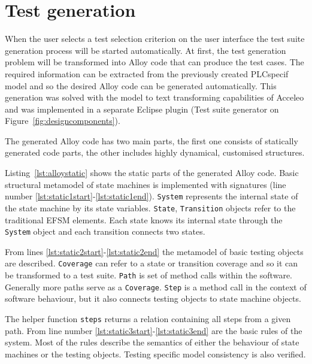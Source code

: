 \section{Test generation}
\label{sec:testgenerationimplementation}
	
When the user selects a test selection criterion on the user interface the test suite generation process will be started automatically. At first, the test generation problem will be transformed into Alloy code that can produce the test cases. The required information can be extracted from the previously created PLCspecif model and so the desired Alloy code can be generated automatically. This generation was solved with the model to text transforming capabilities of Acceleo and was implemented in a separate Eclipse plugin (Test suite generator on Figure~\ref{fig:designcomponents}).
	
The generated Alloy code has two main parts, the first one consists of statically generated code parts, the other includes highly dynamical, customised structures.
	
Listing~\ref{lst:alloystatic} shows the static parts of the generated Alloy code. Basic structural metamodel of state machines is implemented with signatures (line number  \ref{lst:static1start}-\ref{lst:static1end}). \texttt{System} represents the internal state of the state machine by its state variables. \texttt{State}, \texttt{Transition} objects refer to the traditional EFSM elements. Each state knows its internal state through the \texttt{System} object and each transition connects two states.
	
From lines \ref{lst:static2start}-\ref{lst:static2end} the metamodel of basic testing objects are described. \texttt{Coverage} can refer to a state or transition coverage and so it can be transformed to a test suite. \texttt{Path} is set of method calls within the software. Generally more paths serve as a \texttt{Coverage}. \texttt{Step} is a method call in the context of software behaviour, but it also connects testing objects to state machine objects.
	
The helper function \texttt{steps} returns a relation containing all steps from a given path. From line number \ref{lst:static3start}-\ref{lst:static3end} are the basic rules of the system. Most of the rules describe the semantics of either the behaviour of state machines or the testing objects. Testing specific model consistency is also verified.

